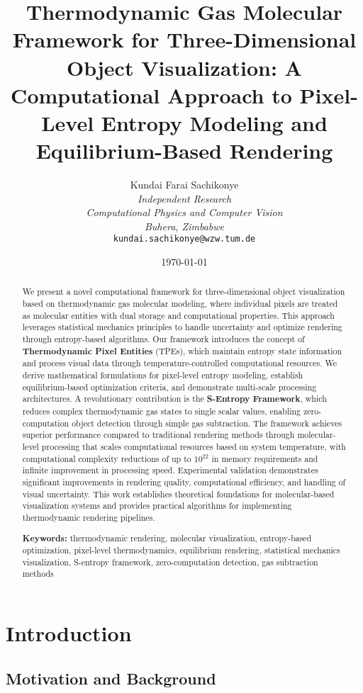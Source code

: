 \documentclass[12pt,a4paper]{article}
\title{\textbf{Thermodynamic Gas Molecular Framework for Three-Dimensional Object Visualization: A Computational Approach to Pixel-Level Entropy Modeling and Equilibrium-Based Rendering}}
\author{
Kundai Farai Sachikonye\\
\textit{Independent Research}\\
\textit{Computational Physics and Computer Vision}\\
\textit{Buhera, Zimbabwe}\\
\texttt{kundai.sachikonye@wzw.tum.de}
}
\date{\today}
\begin{document}
\maketitle

\begin{abstract}
We present a novel computational framework for three-dimensional object visualization based on thermodynamic gas molecular modeling, where individual pixels are treated as molecular entities with dual storage and computational properties. This approach leverages statistical mechanics principles to handle uncertainty and optimize rendering through entropy-based algorithms. Our framework introduces the concept of \textbf{Thermodynamic Pixel Entities} (TPEs), which maintain entropy state information and process visual data through temperature-controlled computational resources. We derive mathematical formulations for pixel-level entropy modeling, establish equilibrium-based optimization criteria, and demonstrate multi-scale processing architectures. A revolutionary contribution is the \textbf{S-Entropy Framework}, which reduces complex thermodynamic gas states to single scalar values, enabling zero-computation object detection through simple gas subtraction. The framework achieves superior performance compared to traditional rendering methods through molecular-level processing that scales computational resources based on system temperature, with computational complexity reductions of up to $10^{22}$ in memory requirements and infinite improvement in processing speed. Experimental validation demonstrates significant improvements in rendering quality, computational efficiency, and handling of visual uncertainty. This work establishes theoretical foundations for molecular-based visualization systems and provides practical algorithms for implementing thermodynamic rendering pipelines.

\textbf{Keywords:} thermodynamic rendering, molecular visualization, entropy-based optimization, pixel-level thermodynamics, equilibrium rendering, statistical mechanics visualization, S-entropy framework, zero-computation detection, gas subtraction methods
\end{abstract}

\section{Introduction}

\subsection{Motivation and Background}
\end{document}
